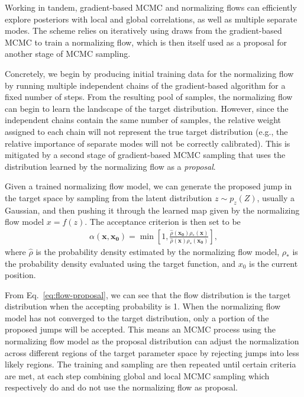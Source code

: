 \documentclass[twocolumn]{aastex631}
\begin{document}
Working in tandem, gradient-based MCMC and normalizing flows can efficiently
explore posteriors with local and global correlations, as well as multiple
separate modes.  The scheme relies on iteratively using draws from the
gradient-based MCMC to train a normalizing flow, which is then itself used as a
proposal for another stage of MCMC sampling.

Concretely, we begin by producing initial training data for the normalizing
flow by running multiple independent chains of the gradient-based algorithm for
a fixed number of steps.  From the resulting pool of samples, the normalizing
flow can begin to learn the landscape of the target distribution.
However, since the independent chains contain the same number of samples, the
relative weight assigned to each chain will not represent the true target
distribution (e.g., the relative importance of separate modes will not be
correctly calibrated). This is mitigated by a second stage of gradient-based
MCMC sampling that uses the distribution learned by the normalizing flow as a
\textit{proposal}.

Given a trained normalizing flow model, we can generate the proposed jump in
the target space by sampling from the latent distribution $z \sim p_z(Z)$,
usually a Gaussian, and then pushing it through the learned map given by the
normalizing flow model $x=f(z)$.  The acceptance criterion is then set to be
\begin{align} \label{eq:flow-proposal}
    \alpha(\mathbf{x},\mathbf{x_0}) = \min \left[ 1, \frac{\hat{\rho}(\mathbf{x_0})\rho_*(\mathbf{x})}{\hat{\rho}(\mathbf{x})\rho_*(\mathbf{x_0})}\right],
\end{align}
where $\hat{\rho}$ is the probability density estimated by the normalizing flow
model, $\rho_*$ is the probability density evaluated using the target function,
and $x_0$ is the current position.

From Eq.~\eqref{eq:flow-proposal}, we can see that the flow distribution is the
target distribution when the accepting probability is 1. When the normalizing
flow model has not converged to the target distribution, only a portion of the
proposed jumps will be accepted. This means an MCMC process using the
normalizing flow model as the proposal distribution can adjust the
normalization across different regions of the target parameter space by
rejecting jumps into less likely regions. The training and sampling are then
repeated until certain criteria are met, at each step combining global and
local MCMC sampling which respectively do and do not use the normalizing flow
as proposal.
\end{document}
